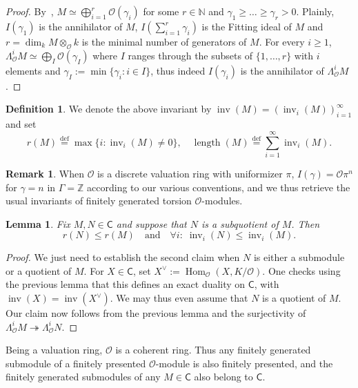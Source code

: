 \documentclass[11pt]{article}
\newtheorem{lemm}[theo]{Lemma}
\theoremstyle{definition}
\newtheorem{defi}[theo]{Definition}
\newtheorem{rema}[theo]{Remark}
\numberwithin{equation}{section}
\numberwithin{figure}{section}
\numberwithin{table}{section}
\DeclareMathOperator{\inv}{inv}
\DeclareMathOperator{\Hom}{Hom}
\DeclareMathOperator{\length}{length}
\newcommand{\eqd}{\stackrel{\mathrm{def}}{=}}
\newcommand{\sfC}{\mathsf{C}}
\let\oldforall\forall
\renewcommand*{\forall}{\mathrel{\oldforall}}
\begin{document}
\begin{proof}
By~\cite[6.1.14]{GaRa03}, $M\simeq\bigoplus_{i=1}^{r}\mathcal{O}(\gamma_{i})$ for some $r\in\mathbb{N}$ and $\gamma_{1}\geq\dots\geq\gamma_{r}>0$. Plainly, $I(\gamma_{1})$ is the annihilator of $M$, $I(\sum_{i=1}^{r}\gamma_{i})$ is the Fitting ideal of $M$ and $r=\dim_{k}M\otimes_{\mathcal{O}}k$ is the minimal number of generators of $M$. For every $i\geq1$, $\Lambda_{\mathcal{O}}^{i}M\simeq\bigoplus_{I}\mathcal{O}(\gamma_{I})$ where $I$ ranges through the subsets of $\{1,\dots,r\}$ with $i$ elements and $\gamma_{I}:=\min\{\gamma_{i}:i\in I\}$, thus indeed $I(\gamma_{i})$ is the annihilator of $\Lambda_{\mathcal{O}}^{i}M$.
\end{proof}

\begin{defi}
We denote the above invariant by $\inv(M)=(\inv_{i}(M))_{i=1}^{\infty}$ and set
\[
r(M)\eqd\max\{i:\inv_{i}(M)\neq0\},\quad\length(M)\eqd\sum_{i=1}^{\infty}\inv_{i}(M).
\]
\end{defi}

\begin{rema}
When $\mathcal{O}$ is a discrete valuation ring with uniformizer $\pi$, $I(\gamma)=\mathcal{O}\pi^{n}$ for $\gamma=n$ in $\Gamma=\mathbb{Z}$ according to our various conventions, and we thus retrieve the usual invariants of finitely generated torsion $\mathcal{O}$-modules.
\end{rema}

\begin{lemm}\label{lem:InvTorsOModdecUnderSubquo}
Fix $M,N\in\sfC$ and suppose that $N$ is a subquotient of $M$. Then
\[
r(N)\leq r(M)\quad\text{and}\quad\forall i:\;\inv_{i}(N)\leq\inv_{i}(M).
\]
\end{lemm}

\begin{proof}
We just need to establish the second claim when $N$ is either a submodule or a quotient of $M$. For $X\in\sfC$, set $X^{\vee}:=\Hom_{\mathcal{O}}(X,K/\mathcal{O})$. One checks using the previous lemma that this defines an exact duality on $\sfC$, with $\inv(X)=\inv(X^{\vee})$. We may thus even assume that $N$ is a quotient of $M$. Our claim now follows from the previous lemma and the surjectivity of $\Lambda_{\mathcal{O}}^{i}M\twoheadrightarrow\Lambda_{\mathcal{O}}^{i}N$.
\end{proof}

Being a valuation ring, $\mathcal{O}$ is a coherent ring. Thus any finitely generated submodule of a finitely presented $\mathcal{O}$-module is also finitely presented, and the finitely generated submodules of any $M\in\sfC$ also belong to $\sfC$.
\end{document}

